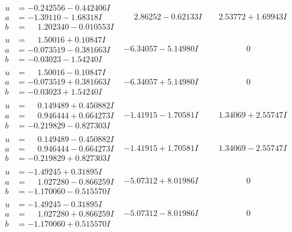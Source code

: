 \documentclass[1p]{elsarticle_modified}
\theoremstyle{definition}
\begin{document}
$$\begin{array}{c|c|c}
\begin{aligned}
u &= -0.242556 - 0.442406 I \\
a &= -1.39110 - 1.68318 I \\
b &= \phantom{-}1.202340 - 0.010553 I\end{aligned}
 & \phantom{-}2.86252 - 0.62133 I & \phantom{-}2.53772 + 1.69943 I \\ \hline\begin{aligned}
u &= \phantom{-}1.50016 + 0.10847 I \\
a &= -0.073519 - 0.381663 I \\
b &= -0.03023 - 1.54240 I\end{aligned}
 & -6.34057 - 5.14980 I & \phantom{-0.000000 } 0 \\ \hline\begin{aligned}
u &= \phantom{-}1.50016 - 0.10847 I \\
a &= -0.073519 + 0.381663 I \\
b &= -0.03023 + 1.54240 I\end{aligned}
 & -6.34057 + 5.14980 I & \phantom{-0.000000 } 0 \\ \hline\begin{aligned}
u &= \phantom{-}0.149489 + 0.450882 I \\
a &= \phantom{-}0.946444 + 0.664273 I \\
b &= -0.219829 - 0.827303 I\end{aligned}
 & -1.41915 - 1.70581 I & \phantom{-}1.34069 + 2.55747 I \\ \hline\begin{aligned}
u &= \phantom{-}0.149489 - 0.450882 I \\
a &= \phantom{-}0.946444 - 0.664273 I \\
b &= -0.219829 + 0.827303 I\end{aligned}
 & -1.41915 + 1.70581 I & \phantom{-}1.34069 - 2.55747 I \\ \hline\begin{aligned}
u &= -1.49245 + 0.31895 I \\
a &= \phantom{-}1.027280 - 0.866259 I \\
b &= -1.170060 - 0.515570 I\end{aligned}
 & -5.07312 + 8.01986 I & \phantom{-0.000000 } 0 \\ \hline\begin{aligned}
u &= -1.49245 - 0.31895 I \\
a &= \phantom{-}1.027280 + 0.866259 I \\
b &= -1.170060 + 0.515570 I\end{aligned}
 & -5.07312 - 8.01986 I & \phantom{-0.000000 } 0 \\ \hline\begin{aligned}

\end{aligned}
\end{array}$$
\end{document}
